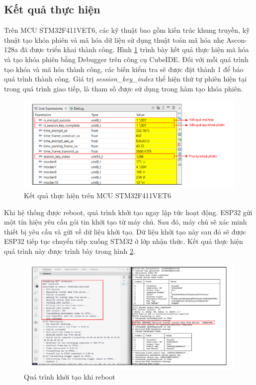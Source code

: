 \subsection{Kết quả thực hiện}
Trên MCU STM32F411VET6, các kỹ thuật bao gồm kiến trúc khung truyền, kỹ thuật tạo khóa phiên và mã hóa dữ liệu sử dụng thuật toán mã hóa nhẹ Ascon-128a đã được triển khai thành công. Hình \ref{fig:stm32log} trình bày kết quả thực hiện mã hóa và tạo khóa phiên bằng Debugger trên công cụ CubeIDE. Đối với mỗi quá trình tạo khóa và mã hóa thành công, các biến kiểm tra sẽ được đặt thành 1 để báo quá trình thành công. Giá trị \textit{session\_key\_index} thể hiện thứ tự phiên hiện tại trong quá trình giao tiếp, là tham số được sử dụng trong hàm tạo khóa phiên.
\begin{figure}[h]
    \centering
    \includegraphics[width=0.8\linewidth]{stm32log.pdf}
    \caption{Kết quả thực hiện trên MCU STM32F411VET6}
    \label{fig:stm32log}
\end{figure}

Khi hệ thống được reboot, quá trình khởi tạo ngay lập tức hoạt động. ESP32 gửi một tín hiệu yêu cầu gói tin khởi tạo từ máy chủ. Sau đó, máy chủ sẽ xác minh thiết bị yêu cầu và gửi về dữ liệu khởi tạo. Dữ liệu khởi tạo này sau đó sẽ được ESP32 tiếp tục chuyển tiếp xuống STM32 ở lớp nhận thức. Kết quả thực hiện quá trình này được trình bày trong hình \ref{fig:initlog}.

\begin{figure}[h]
    \centering
    \includegraphics[width=1\linewidth]{initlog.pdf}
    \caption{Quá trình khởi tạo khi reboot}
    \label{fig:initlog}
\end{figure}

